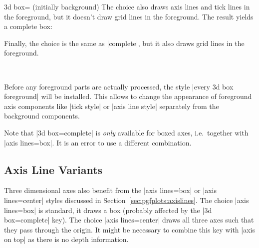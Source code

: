 {\begin{pgfplotskey}{3d box= (initially background)}
	The choice  also draws axis lines and tick lines in the foreground, but it doesn't draw grid lines in the foreground. The result yields a complete box:
\begin{codeexample}[]
\end{codeexample}

	Finally, the choice  is the same as |complete|, but it also draws grid lines in the foreground.
\begin{codeexample}[]
%
~
\end{codeexample}
	
	Before any foreground parts are actually processed, the style |every 3d box foreground| will be installed. This allows to change the appearance of foreground axis components like |tick style| or |axis line style| separately from the background components.

	Note that |3d box=complete| is \emph{only} available for boxed axes, i.e.\ together with |axis lines=box|. It is an error to use a different combination.
\end{pgfplotskey}



\subsection{Axis Line Variants}
\label{sec:pgfplots:axislines:3d}
Three dimensional axes also benefit from the |axis lines=box| or |axis lines=center| styles discussed in Section~\ref{sec:pgfplots:axislines}. The choice |axis lines=box| is standard, it draws a box (probably affected by the |3d box=complete| key). 
The choice |axis lines=center| draws all three axes such that they pass through the origin. It might be necessary to combine this key with |axis on top| as there is no depth information.

}
